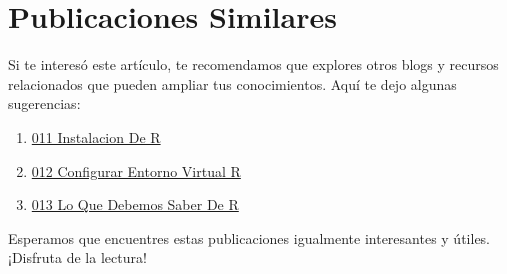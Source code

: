 \documentclass[
  jou,
  floatsintext,
  longtable,
  a4paper,
  nolmodern,
  notxfonts,
  notimes,
  12pt,
  colorlinks=true,linkcolor=blue,citecolor=blue,urlcolor=blue]{apa7}
\providecommand{\tightlist}{%
  \setlength{\itemsep}{0pt}\setlength{\parskip}{0pt}}
\begin{document}
\section{Publicaciones Similares}\label{publicaciones-similares}

Si te interesó este artículo, te recomendamos que explores otros blogs y
recursos relacionados que pueden ampliar tus conocimientos. Aquí te dejo
algunas sugerencias:

\begin{enumerate}
\def\labelenumi{\arabic{enumi}.}
\tightlist
\item
  \href{https://numerus-scriptum.netlify.app/r/2020-06-10-011-instalacion-de-r/index.pdf}{}
  \href{https://numerus-scriptum.netlify.app/r/2020-06-10-011-instalacion-de-r}{011
  Instalacion De R}
\item
  \href{https://numerus-scriptum.netlify.app/r/2020-06-10-012-configurar-entorno-virtual-r/index.pdf}{}
  \href{https://numerus-scriptum.netlify.app/r/2020-06-10-012-configurar-entorno-virtual-r}{012
  Configurar Entorno Virtual R}
\item
  \href{https://numerus-scriptum.netlify.app/r/2020-06-10-013-lo-que-debemos-saber-de-r/index.pdf}{}
  \href{https://numerus-scriptum.netlify.app/r/2020-06-10-013-lo-que-debemos-saber-de-r}{013
  Lo Que Debemos Saber De R}
\end{enumerate}

Esperamos que encuentres estas publicaciones igualmente interesantes y
útiles. ¡Disfruta de la lectura!
\end{document}
